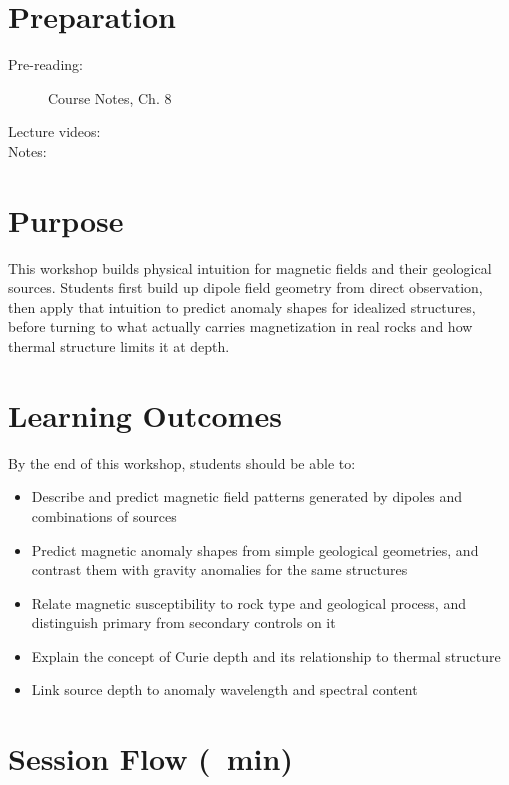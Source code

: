 
\workshopstart

\vspace{-0.75em}
\section*{Preparation}

\begin{description}
  \item[Pre-reading:] Course Notes, Ch. 8
  \item[Lecture videos:]
  \item[Notes:]
\end{description}

\section*{Purpose}

This workshop builds physical intuition for magnetic fields and their geological sources. Students first build up dipole field geometry from direct observation, then apply that intuition to predict anomaly shapes for idealized structures, before turning to what actually carries magnetization in real rocks and how thermal structure limits it at depth.

\section*{Learning Outcomes}

By the end of this workshop, students should be able to:
\begin{itemize}
  \item Describe and predict magnetic field patterns generated by dipoles and combinations of sources
  \item Predict magnetic anomaly shapes from simple geological geometries, and contrast them with gravity anomalies for the same structures
  \item Relate magnetic susceptibility to rock type and geological process, and distinguish primary from secondary controls on it
  \item Explain the concept of Curie depth and its relationship to thermal structure
  \item Link source depth to anomaly wavelength and spectral content
\end{itemize}

\section*{Session Flow (\timelinelength\ min)}

